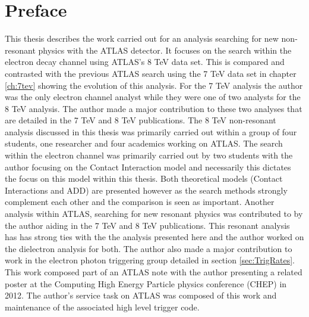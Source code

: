 \chapter*{Preface}

This thesis describes the work carried out for an analysis searching for new non-resonant physics with the ATLAS detector. It focuses on the search within the electron decay channel using ATLAS's 8 TeV data set. This is compared and contrasted with the previous ATLAS search using the 7 TeV data set in chapter \ref{ch:7tev} showing the evolution of this analysis. For the 7 TeV analysis the author was the only electron channel analyst while they were one of two analysts for the 8 TeV analysis. The author made a major contribution to these two analyses that are detailed in the 7 TeV \cite{PhysRevD.87.015010} and 8 TeV \cite{ATLAS-CONF-2014-030} publications.
The 8 TeV non-resonant analysis discussed in this thesis was primarily carried out within a group of four students, one researcher and four academics working on ATLAS. The search within the electron channel was primarily carried out by two students with the author focusing on the Contact Interaction model and necessarily this dictates the focus on this model within this thesis. Both theoretical models (Contact Interactions and ADD) are presented however as the search methods strongly complement each other and the comparison is seen as important.
Another analysis within ATLAS, searching for new resonant physics was contributed to by the author aiding in the 7 TeV \cite{Aad:2012hf} and 8 TeV \cite{Z:1515998} publications. This resonant analysis has has strong ties with the the analysis presented here and the author worked on the dielectron analysis for both.
The author also made a major contribution to work in the electron photon triggering group detailed in section \ref{sec:TrigRates}. This work composed part of an ATLAS note \cite{ATL-PHYS-PUB-2011-007} with the author presenting a related poster \cite{Duguid:1450151} at the Computing High Energy Particle physics conference (CHEP) in 2012. 
The author's service task on ATLAS was composed of this work and maintenance of the associated high level trigger code.





